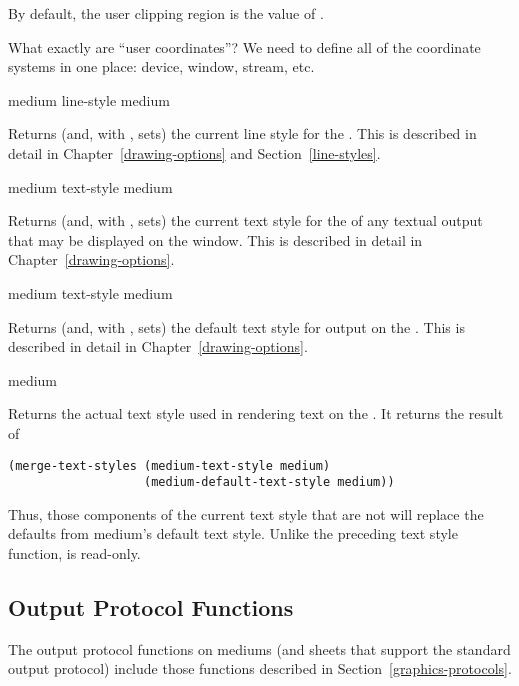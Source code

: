 By default, the user clipping region is the value of .

 {What exactly are ``user coordinates''?  We need to define all of
the coordinate systems in one place: device, window, stream, etc.}


 {medium}
 {line-style medium}

Returns (and, with , sets) the current line style for the 
.  This is described in detail in Chapter~\ref{drawing-options} and
Section~\ref{line-styles}.


 {medium}
 {text-style medium}

Returns (and, with , sets) the current text style for the 
 of any textual output that may be displayed on the window.  This is
described in detail in Chapter~\ref{drawing-options}.


 {medium}
 {text-style medium}

Returns (and, with , sets) the default text style for output on the
 .  This is described in detail in
Chapter~\ref{drawing-options}.


 {medium}

Returns the actual text style used in rendering text on the 
.  It returns the result of

\begin{verbatim} 
(merge-text-styles (medium-text-style medium)
                   (medium-default-text-style medium))
\end{verbatim}

Thus, those components of the current text style that are not  will
replace the defaults from medium's default text style.  Unlike the preceding
text style function,  is read-only.


\subsection {Output Protocol Functions} 

The output protocol functions on mediums (and sheets that support the
standard output protocol) include those functions described in
Section~\ref{graphics-protocols}.


